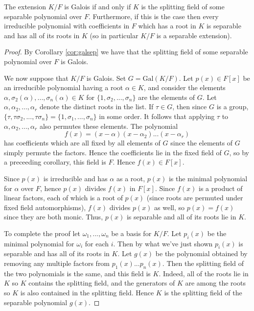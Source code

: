 \documentclass[12pt, a4paper, oneside, openright, titlepage]{book}
\begin{document}
\begin{thm}\label{thm:galiffsplit}
    The extension $K/F$ is Galois if and only if $K$ is the splitting field of some separable polynomial over $F$. Furthermore, if this is the case then every irreducible polynomial with coefficients in $F$ which has a root in $K$ is separable and has all of its roots in $K$ (so in particular $K/F$ is a separable extension).
\end{thm}
\begin{proof}
    By Corollary \ref{cor:galsep} we have that the splitting field of some separable polynomial over $F$ is Galois. 

    We now suppose that $K/F$ is Galois. Set $G = \text{Gal}(K/F)$. Let $p(x) \in F[x]$ be an irreducible polynomial having a root $\alpha \in K$, and consider the elements $\alpha,\sigma_2(\alpha),...,\sigma_n(\alpha)  \in K$ for $\{1,\sigma_2,...,\sigma_n\}$ are the elements of $G$. Let $\alpha,\alpha_2,...,\alpha_r$ denote the distinct roots in the list. If $\tau \in G$, then since $G$ is a group, $\{\tau,\tau\sigma_2,...,\tau\sigma_n\} = \{1,\sigma_1,...,\sigma_n\}$ in some order. It follows that applying $\tau$ to $\alpha,\alpha_2,...,\alpha_r$ also permutes these elements. The polynomial \begin{equation*}
        f(x) = (x-\alpha)(x-\alpha_2)...(x-\alpha_r)
    \end{equation*}
    has coefficients which are all fixed by all elements of $G$ since the elements of $G$ simply permute the factors. Hence the coefficients lie in the fixed field of $G$, so by a preceeding corollary, this field is $F$. Hence $f(x) \in F[x]$.

    Since $p(x)$ is irreducible and has $\alpha$ as a root, $p(x)$ is the minimal polynomial for $\alpha$ over $F$, hence $p(x)$ divides $f(x)$ in $F[x]$. Since $f(x)$ is a product of linear factors, each of which is a root of $p(x)$ (since roots are permuted under fixed field automorphisms), $f(x)$ divides $p(x)$ as well, so $p(x) = f(x)$ since they are both monic. Thus, $p(x)$ is separable and all of its roots lie in $K$.

    To complete the proof let $\omega_1,...,\omega_n$ be a basis for $K/F$. Let $p_i(x)$ be the minimal polynomial for $\omega_i$ for each $i$. Then by what we've just shown $p_i(x)$ is separable and has all of its roots in $K$. Let $g(x)$ be the polynomial obtained by removing any multiple factors from $p_1(x)...p_n(x)$. Then the splitting field of the two polynomials is the same, and this field is $K$. Indeed, all of the roots lie in $K$ so $K$ contains the splitting field, and the generators of $K$ are among the roots so $K$ is also contained in the splitting field. Hence $K$ is the splitting field of the separable polynomial $g(x)$.
\end{proof}
\end{document}
